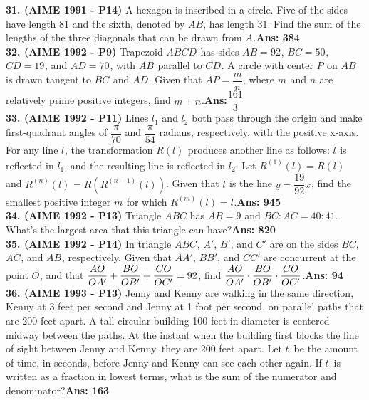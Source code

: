 \documentclass[letterpaper,10pt,addpoints]{exam}
\begin{document}
\textbf{31. (AIME 1991 - P14) }A hexagon is inscribed in a circle. Five of the sides have length $81$ and the sixth, denoted by $\overline{AB}$, has length $31$. Find the sum of the lengths of the three diagonals that can be drawn from $A_{}^{}$.\quad\textbf{Ans: 384}\\

\textbf{32. (AIME 1992 - P9) }Trapezoid $ABCD^{}_{}$ has sides $AB=92^{}_{}$, $BC=50^{}_{}$, $CD=19^{}_{}$, and $AD=70^{}_{}$, with $AB^{}_{}$ parallel to $CD^{}_{}$. A circle with center $P^{}_{}$ on $AB^{}_{}$ is drawn tangent to $BC^{}_{}$ and $AD^{}_{}$. Given that $AP=\dfrac{m}{n}$, where $m^{}_{}$ and $n^{}_{}$ are relatively prime positive integers, find $m+n^{}_{}$.\quad\textbf{Ans:}$ \dfrac{161}{3}$\\

\textbf{33. (AIME 1992 - P11) }Lines $l_1^{}$ and $l_2^{}$ both pass through the origin and make first-quadrant angles of $\dfrac{\pi}{70}$ and $\dfrac{\pi}{54}$ radians, respectively, with the positive x-axis. For any line $l^{}_{}$, the transformation $R(l)^{}_{}$ produces another line as follows: $l^{}_{}$ is reflected in $l_1^{}$, and the resulting line is reflected in $l_2^{}$. Let $R^{(1)}(l)=R(l)^{}_{}$ and $R^{(n)}(l)^{}_{}=R\left(R^{(n-1)}(l)\right)$. Given that $l^{}_{}$ is the line $y=\dfrac{19}{92}x^{}_{}$, find the smallest positive integer $m^{}_{}$ for which $R^{(m)}(l)=l^{}_{}$.\quad\textbf{Ans: 945}\\

\textbf{34. (AIME 1992 - P13) }Triangle $ABC$ has $AB=9$ and $BC: AC=40: 41$. What's the largest area that this triangle can have?\quad\textbf{Ans: 820}\\

\textbf{35. (AIME 1992 - P14) }In triangle $ABC^{}_{}$, $A'$, $B'$, and $C'$ are on the sides $BC$, $AC^{}_{}$, and $AB^{}_{}$, respectively. Given that $AA'$, $BB'$, and $CC'$ are concurrent at the point $O^{}_{}$, and that $\mathlarger{\frac{AO^{}_{}}{OA'}+\frac{BO}{OB'}+\frac{CO}{OC'}=92}$, find $\mathlarger{\frac{AO}{OA'}\cdot \frac{BO}{OB'}\cdot \frac{CO}{OC'}}$.\quad\textbf{Ans: 94}\\

\textbf{36. (AIME 1993 - P13) }Jenny and Kenny are walking in the same direction, Kenny at 3 feet per second and Jenny at 1 foot per second, on parallel paths that are 200 feet apart. A tall circular building 100 feet in diameter is centered midway between the paths. At the instant when the building first blocks the line of sight between Jenny and Kenny, they are 200 feet apart. Let $t\,$ be the amount of time, in seconds, before Jenny and Kenny can see each other again. If $t\,$ is written as a fraction in lowest terms, what is the sum of the numerator and denominator?\quad\textbf{Ans: 163}\\
\end{document}
